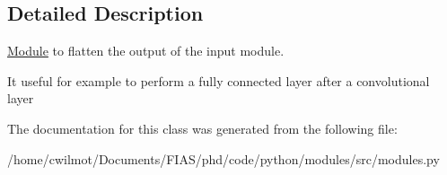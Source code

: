 \subsection{Detailed Description}
\hyperlink{classmodules_1_1_module}{Module} to flatten the output of the input module. 

It useful for example to perform a fully connected layer after a convolutional layer 

The documentation for this class was generated from the following file\+:\begin{DoxyCompactItemize}
\item 
/home/cwilmot/\+Documents/\+F\+I\+A\+S/phd/code/python/modules/src/modules.\+py\end{DoxyCompactItemize}
